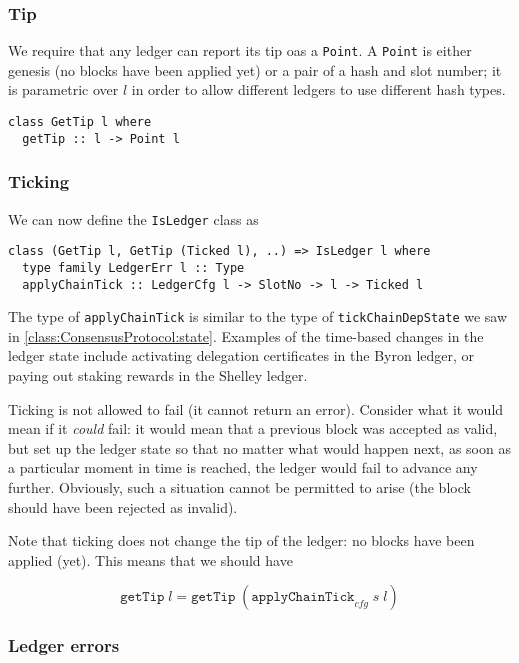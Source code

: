 \subsubsection{Tip}

We require that any ledger can report its tip oas a \lstinline!Point!. A
\lstinline!Point! is either genesis (no blocks have been applied yet) or a pair
of a hash and slot number; it is parametric over $l$ in order to allow
different ledgers to use different hash types.
%
\begin{lstlisting}
class GetTip l where
  getTip :: l -> Point l
\end{lstlisting}

\subsubsection{Ticking}

We can now define the \lstinline!IsLedger! class as
%
\begin{lstlisting}
class (GetTip l, GetTip (Ticked l), ..) => IsLedger l where
  type family LedgerErr l :: Type
  applyChainTick :: LedgerCfg l -> SlotNo -> l -> Ticked l
\end{lstlisting}

The type of \lstinline!applyChainTick! is similar to the type of
\lstinline!tickChainDepState! we saw in \cref{class:ConsensusProtocol:state}.
Examples of the time-based changes in the ledger state include activating
delegation certificates in the Byron ledger, or paying out staking rewards
in the Shelley ledger.

Ticking is not allowed to fail (it cannot return an error). Consider what it
would mean if it \emph{could} fail: it would mean that a previous block was
accepted as valid, but set up the ledger state so that no matter what would
happen next, as soon as a particular moment in time is reached, the ledger would
fail to advance any further. Obviously, such a situation cannot be permitted to
arise (the block should have been rejected as invalid).

Note that ticking does not change the tip of the ledger: no blocks have been
applied (yet). This means that we should have

\begin{equation}
  \mathtt{getTip} \; l
= \mathtt{getTip} \; (\mathtt{applyChainTick}_\mathit{cfg} \; s \; l)
\end{equation}

\subsubsection{Ledger errors}


